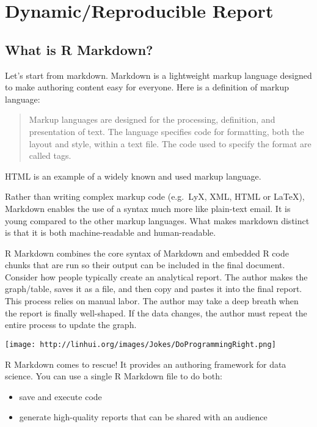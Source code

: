 \documentclass[
]{article}
\providecommand{\tightlist}{%
  \setlength{\itemsep}{0pt}\setlength{\parskip}{0pt}}
\begin{document}
\hypertarget{dynamicreproducible-report}{%
\section{Dynamic/Reproducible Report}\label{dynamicreproducible-report}}

\hypertarget{what-is-r-markdown}{%
\subsection{What is R Markdown?}\label{what-is-r-markdown}}

Let's start from markdown. Markdown is a lightweight markup language
designed to make authoring content easy for everyone. Here is a
definition of markup language:

\begin{quote}
Markup languages are designed for the processing, definition, and
presentation of text. The language specifies code for formatting, both
the layout and style, within a text file. The code used to specify the
format are called tags.
\end{quote}

HTML is an example of a widely known and used markup language.

Rather than writing complex markup code (e.g.~LyX, XML, HTML or LaTeX),
Markdown enables the use of a syntax much more like plain-text email. It
is young compared to the other markup languages. What makes markdown
distinct is that it is both machine-readable and human-readable.

R Markdown combines the core syntax of Markdown and embedded R code
chunks that are run so their output can be included in the final
document. Consider how people typically create an analytical report. The
author makes the graph/table, saves it as a file, and then copy and
pastes it into the final report. This process relies on manual labor.
The author may take a deep breath when the report is finally
well-shaped. If the data changes, the author must repeat the entire
process to update the graph.

\texttt{[image: http://linhui.org/images/Jokes/DoProgrammingRight.png]}

R Markdown comes to rescue! It provides an authoring framework for data
science. You can use a single R Markdown file to do both:

\begin{itemize}
\tightlist
\item
  save and execute code
\item
  generate high-quality reports that can be shared with an audience
\end{itemize}
\end{document}
